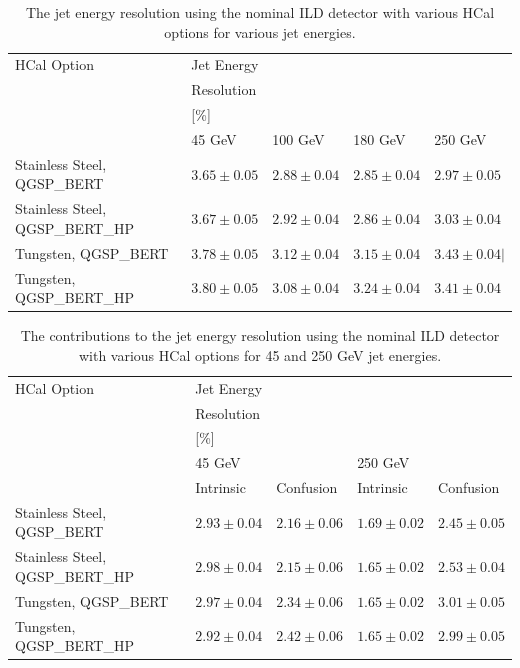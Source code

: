 \begin{table}[h!]
\centering
\begin{tabular}{ l l l l l }
\hline
HCal Option & Jet Energy & & & \\
 & Resolution & & & \\
 & [\%] & & & \\
 & 45 GeV & 100 GeV & 180 GeV & 250 GeV \\
\hline
Stainless Steel, QGSP\_BERT & $3.65 \pm 0.05$ &$2.88 \pm 0.04$ &$2.85 \pm 0.04$ &$2.97 \pm 0.05$ \\
Stainless Steel, QGSP\_BERT\_HP & $3.67 \pm 0.05$ &$2.92 \pm 0.04$ &$2.86 \pm 0.04$ &$3.03 \pm 0.04$ \\
Tungsten, QGSP\_BERT & $3.78 \pm 0.05$ & $3.12 \pm 0.04$ & $3.15 \pm 0.04$ & $3.43 \pm 0.04 |$ \\
Tungsten, QGSP\_BERT\_HP & $3.80 \pm 0.05$ & $3.08 \pm 0.04$ & $3.24 \pm 0.04$ & $3.41 \pm 0.04$ \\
\hline
\end{tabular}
\caption[The jet energy resolution using the nominal ILD detector with various HCal options for various jet energies.]{The jet energy resolution using the nominal ILD detector with various HCal options for various jet energies.}
\label{table:jerhcalabsmaterial}
\end{table}

\begin{table}[h!]
\centering
\begin{tabular}{ l l l l l }
\hline
HCal Option & Jet Energy & & & \\
 & Resolution & & & \\
 & [\%] & & & \\
 & 45 GeV & & 250 GeV & \\
 & Intrinsic & Confusion & Intrinsic & Confusion \\
\hline
Stainless Steel, QGSP\_BERT & $2.93 \pm 0.04$ & $2.16 \pm 0.06$ & $1.69 \pm 0.02$ &$2.45 \pm 0.05$ \\
Stainless Steel, QGSP\_BERT\_HP & $2.98 \pm 0.04$ &$2.15 \pm 0.06$ &$1.65 \pm 0.02$ &$2.53 \pm 0.04$ \\
Tungsten, QGSP\_BERT & $2.97 \pm 0.04$ & $2.34 \pm 0.06$ & $1.65 \pm 0.02$ & $3.01 \pm 0.05$ \\
Tungsten, QGSP\_BERT\_HP & $2.92 \pm 0.04$ & $2.42 \pm 0.06$ & $1.65 \pm 0.02$ & $2.99 \pm 0.05$ \\
\hline
\end{tabular}
\caption[The contributions to the jet energy resolution using the nominal ILD detector with various HCal options for 45 and 250 GeV jet energies.]{The contributions to the jet energy resolution using the nominal ILD detector with various HCal options for 45 and 250 GeV jet energies.}
\label{table:jerbdhcalabsmaterial}
\end{table}

